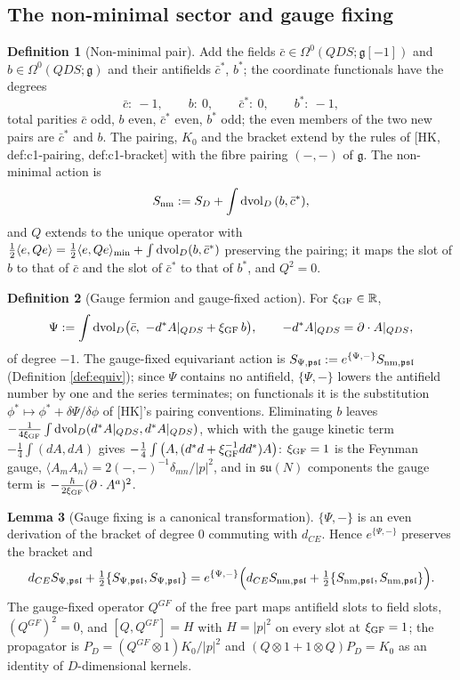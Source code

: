 \documentclass[11pt]{article}
\theoremstyle{definition}
\newtheorem{definition}{Definition}[section]
\newtheorem{lemma}[definition]{Lemma}
\numberwithin{equation}{section}
\begin{document}
\subsection{The non-minimal sector and gauge fixing}

\begin{definition}[Non-minimal pair]
\label{def:nm}
Add the fields $\bar c\in\Omega^0(QDS;\mathfrak g[-1])$ and $b\in\Omega^0(QDS;\mathfrak g)$ and their antifields $\bar c^*$, $b^*$; the coordinate functionals have the degrees
\[
\bar c:\ -1,\qquad b:\ 0,\qquad \bar c^*:\ 0,\qquad b^*:\ -1,
\]
total parities $\bar c$ odd, $b$ even, $\bar c^*$ even, $b^*$ odd; the even members of the two new pairs are $\bar c^*$ and $b$. The pairing, $K_0$ and the bracket extend by the rules of [HK, def:c1-pairing, def:c1-bracket] with the fibre pairing $(-,-)$ of $\mathfrak g$. The non-minimal action is
\[
S_{\rm nm}:=S_D+\int\mathrm{dvol}_D\,(b,\bar c^*),
\]
and $Q$ extends to the unique operator with $\frac12\langle e,Qe\rangle=\frac12\langle e,Qe\rangle_{\rm min}+\int\mathrm{dvol}_D(b,\bar c^*)$ preserving the pairing; it maps the slot of $b$ to that of $\bar c$ and the slot of $\bar c^*$ to that of $b^*$, and $Q^2=0$.
\end{definition}

\begin{definition}[Gauge fermion and gauge-fixed action]
\label{def:gf}
For $\xi_{\rm GF}\in\mathbb R$,
\[
\Psi:=\int\mathrm{dvol}_D\big(\bar c,\ -d^*A|_{QDS}+\xi_{\rm GF}\,b\big),\qquad -d^*A|_{QDS}=\partial\cdot A|_{QDS},
\]
of degree $-1$. The gauge-fixed equivariant action is $S_{\Psi,\mathfrak{psl}}:=e^{\{\Psi,-\}}S_{{\rm nm},\mathfrak{psl}}$ (Definition \ref{def:equiv}); since $\Psi$ contains no antifield, $\{\Psi,-\}$ lowers the antifield number by one and the series terminates; on functionals it is the substitution $\phi^*\mapsto\phi^*+\delta\Psi/\delta\phi$ of [HK]'s pairing conventions. Eliminating $b$ leaves $-\frac1{4\xi_{\rm GF}}\int\mathrm{dvol}_D(d^*A|_{QDS},d^*A|_{QDS})$, which with the gauge kinetic term $-\frac14\int(dA,dA)$ gives $-\frac14\int\big(A,(d^*d+\xi_{\rm GF}^{-1}dd^*)A\big)$: $\xi_{\rm GF}=1$ is the Feynman gauge, $\langle A_mA_n\rangle=2(-,-)^{-1}\delta_{mn}/|p|^2$, and in $\mathfrak{su}(N)$ components the gauge term is $-\frac{\hbar}{2\xi_{\rm GF}}(\partial\cdot A^a)^2$.
\end{definition}

\begin{lemma}[Gauge fixing is a canonical transformation]
\label{lem:canon}
$\{\Psi,-\}$ is an even derivation of the bracket of degree $0$ commuting with $d_{CE}$. Hence $e^{\{\Psi,-\}}$ preserves the bracket and
\[
d_{CE}S_{\Psi,\mathfrak{psl}}+\tfrac12\{S_{\Psi,\mathfrak{psl}},S_{\Psi,\mathfrak{psl}}\}=e^{\{\Psi,-\}}\Big(d_{CE}S_{{\rm nm},\mathfrak{psl}}+\tfrac12\{S_{{\rm nm},\mathfrak{psl}},S_{{\rm nm},\mathfrak{psl}}\}\Big).
\]
The gauge-fixed operator $Q^{GF}$ of the free part maps antifield slots to field slots, $(Q^{GF})^2=0$, and $[Q,Q^{GF}]=H$ with $H=|p|^2$ on every slot at $\xi_{\rm GF}=1$; the propagator is $P_D=(Q^{GF}\otimes1)K_0/|p|^2$ and $(Q\otimes1+1\otimes Q)P_D=K_0$ as an identity of $D$-dimensional kernels.
\end{lemma}
\end{document}
